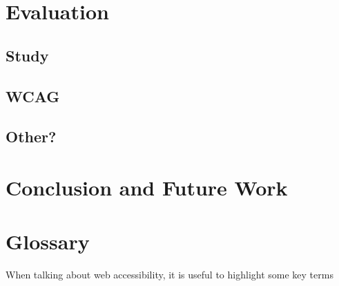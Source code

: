 \documentclass[ %
                    author={Aleena Baig},
                supervisor={Dr Simon Lock},
                    degree={BSc},
                     title={On Making Web Accessible Graphs},
                  subtitle={},
                      year={2019} ]{dissertation}
\begin{document}

\chapter{Evaluation}

\section{Study}

\section{WCAG}


\section{Other?}


\chapter{Conclusion and Future Work}


\chapter{Glossary}


When talking about web accessibility, it is useful to highlight some key terms

\BlankLine
%
\glsaddall
\printglossary[nonumberlist]

\printbibliography
\end{document}
